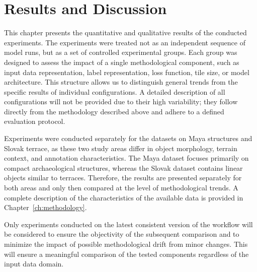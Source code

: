 
\chapter{Results and Discussion}\label{ch:results_discussion}

This chapter presents the quantitative and qualitative results of the conducted experiments. The experiments were treated not as an independent sequence of model runs, but as a set of controlled experimental groups. Each group was designed to assess the impact of a single methodological component, such as input data representation, label representation, loss function, tile size, or model architecture. This structure allows us to distinguish general trends from the specific results of individual configurations. A detailed description of all configurations will not be provided due to their high variability; they follow directly from the methodology described above and adhere to a defined evaluation protocol.

Experiments were conducted separately for the datasets on Maya structures and Slovak terrace, as these two study areas differ in object morphology, terrain context, and annotation characteristics. The Maya dataset focuses primarily on compact archaeological structures, whereas the Slovak dataset contains linear objects similar to terraces. Therefore, the results are presented separately for both areas and only then compared at the level of methodological trends. A complete description of the characteristics of the available data is provided in Chapter~\ref{ch:methodology}.

Only experiments conducted on the latest consistent version of the workflow will be considered to ensure the objectivity of the subsequent comparison and to minimize the impact of possible methodological drift from minor changes. This will ensure a meaningful comparison of the tested components regardless of the input data domain.

